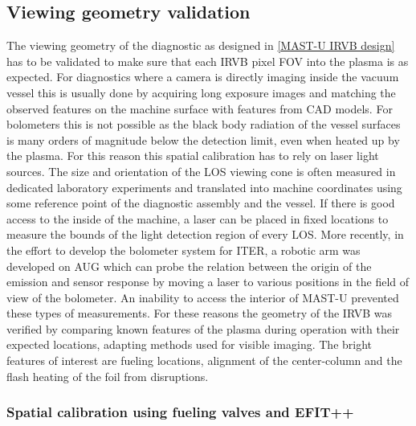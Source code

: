 \subsection{Viewing geometry validation}

The viewing geometry of the diagnostic as designed in \autoref{MAST-U IRVB design} has to be validated to make sure that each IRVB pixel FOV into the plasma is as expected. For diagnostics where a camera is directly imaging inside the vacuum vessel this is usually done by acquiring long exposure images and matching the observed features on the machine surface with features from CAD models. For bolometers this is not possible as the black body radiation of the vessel surfaces is many orders of magnitude below the detection limit, even when heated up by the plasma. For this reason this spatial calibration has to rely on laser light sources. The size and orientation of the LOS viewing cone is often measured in dedicated laboratory experiments and translated into machine coordinates using some reference point of the diagnostic assembly and the vessel.\cite{McCormick2005,Huber2007} If there is good access to the inside of the machine, a laser can be placed in fixed locations to measure the bounds of the light detection region of every LOS.\cite{Reinke2011} More recently, in the effort to develop the bolometer system for ITER, a robotic arm was developed on AUG which can probe the relation between the origin of the emission and sensor response by moving a laser to various positions in the field of view of the bolometer.\cite{Penzel2014} An inability to access the interior of MAST-U prevented these types of measurements. For these reasons the geometry of the IRVB was verified by comparing known features of the plasma during operation with their expected locations, adapting methods used for visible imaging. The bright features of interest are fueling locations, alignment of the center-column and the flash heating of the foil from disruptions.

\subsubsection{Spatial calibration using fueling valves and EFIT++}\label{Spatial calibration using fueling valves and EFIT++}


